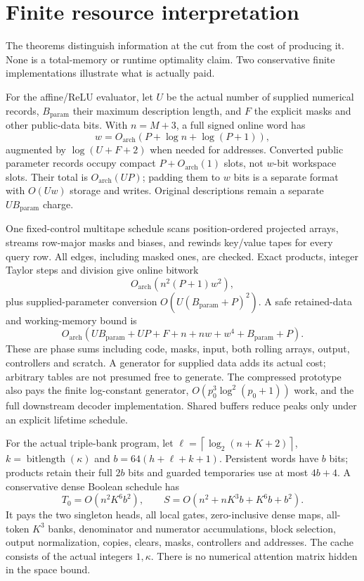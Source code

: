 \documentclass[11pt,letterpaper]{article}
\theoremstyle{definition}\newtheorem{definition}[theorem]{Definition}
\theoremstyle{remark}\newtheorem{remark}[theorem]{Remark}
\newcommand{\ceil}[1]{\left\lceil #1\right\rceil}
\newcommand{\bl}{\operatorname{bitlength}}
\begin{document}
\section{Finite resource interpretation}\label{sec:costs}
The theorems distinguish information at the cut from the cost of producing it. None is a total-memory or runtime optimality claim. Two conservative finite implementations illustrate what is actually paid.

For the affine/ReLU evaluator, let $U$ be the actual number of supplied numerical records, $B_{\mathrm{param}}$ their maximum description length, and $F$ the explicit masks and other public-data bits. With $n=M+3$, a full signed online word has
\[
 w=O_{\mathrm{arch}}(P+\log n+\log(P+1)),
\]
augmented by $\log(U+F+2)$ when needed for addresses. Converted public parameter records occupy compact $P+O_{\mathrm{arch}}(1)$ slots, not $w$-bit workspace slots. Their total is $O_{\mathrm{arch}}(UP)$; padding them to $w$ bits is a separate format with $O(Uw)$ storage and writes. Original descriptions remain a separate $UB_{\mathrm{param}}$ charge.

One fixed-control multitape schedule scans position-ordered projected arrays, streams row-major masks and biases, and rewinds key/value tapes for every query row. All edges, including masked ones, are checked. Exact products, integer Taylor steps and division give online bitwork
\[
 O_{\mathrm{arch}}(n^2(P+1)w^2),
\]
plus supplied-parameter conversion $O(U(B_{\mathrm{param}}+P)^2)$. A safe retained-data and working-memory bound is
\[
 O_{\mathrm{arch}}(UB_{\mathrm{param}}+UP+F+n+nw+w^4+B_{\mathrm{param}}+P).
\]
These are phase sums including code, masks, input, both rolling arrays, output, controllers and scratch. A generator for supplied data adds its actual cost; arbitrary tables are not presumed free to generate. The compressed prototype also pays the finite log-constant generator, $O(p_0^3\log^2(p_0+1))$ work, and the full downstream decoder implementation. Shared buffers reduce peaks only under an explicit lifetime schedule.

For the actual triple-bank program, let $\ell=\ceil{\log_2(n+K+2)}$, $k=\bl(\kappa)$ and $b=64(h+\ell+k+1)$. Persistent words have $b$ bits; products retain their full $2b$ bits and guarded temporaries use at most $4b+4$. A conservative dense Boolean schedule has
\begin{equation}\label{eq:costtriple}
 T_0=O(n^2K^6b^2),\qquad
 S=O(n^2+nK^3b+K^6b+b^2).
\end{equation}
It pays the two singleton heads, all local gates, zero-inclusive dense maps, all-token $K^3$ banks, denominator and numerator accumulations, block selection, output normalization, copies, clears, masks, controllers and addresses. The cache consists of the actual integers $1,\kappa$. There is no numerical attention matrix hidden in the space bound.
\end{document}
